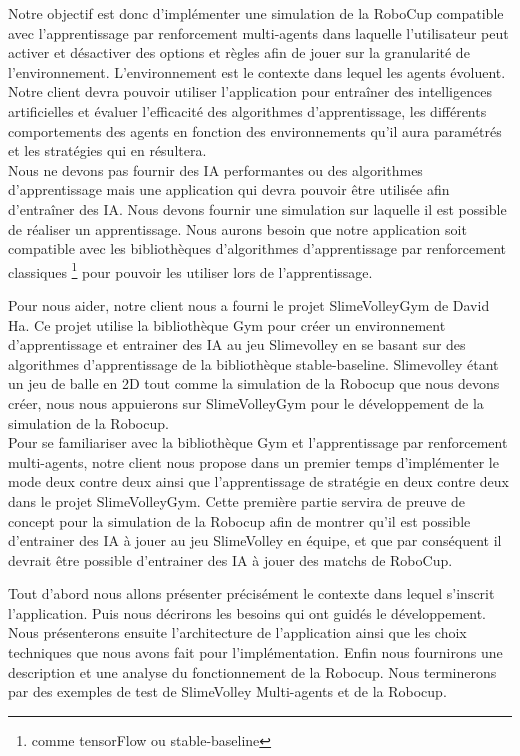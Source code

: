 \documentclass[11pt, a4paper]{article}
\begin{document}
	Notre objectif est donc d'implémenter une simulation de la RoboCup compatible avec l'apprentissage par renforcement multi-agents dans laquelle l'utilisateur peut activer et désactiver des options et règles afin de jouer sur la granularité de l'environnement. L'environnement est le contexte dans lequel les agents évoluent. \\
	Notre client devra pouvoir utiliser l'application pour entraîner des intelligences artificielles et évaluer l'efficacité des algorithmes d'apprentissage, les différents comportements des agents en fonction des environnements qu'il aura paramétrés et les stratégies qui en résultera.\\
	Nous ne devons pas fournir des IA performantes ou des algorithmes d'apprentissage mais une application qui devra pouvoir être utilisée afin d'entraîner des IA. Nous devons fournir une simulation sur laquelle il est possible de réaliser un apprentissage. Nous aurons besoin que notre application soit compatible avec les bibliothèques d'algorithmes d'apprentissage par renforcement classiques \footnote{comme tensorFlow ou stable-baseline} pour pouvoir les utiliser lors de l'apprentissage.

	Pour nous aider, notre client nous a fourni le projet SlimeVolleyGym de David Ha. Ce projet utilise la bibliothèque Gym pour créer un environnement d'apprentissage et entrainer des IA au jeu Slimevolley en se basant sur des algorithmes d'apprentissage de la bibliothèque stable-baseline. Slimevolley étant un jeu de balle en 2D tout comme la simulation de la Robocup que nous devons créer, nous nous appuierons sur SlimeVolleyGym pour le développement de la  simulation de la Robocup.\\
	Pour se familiariser avec la bibliothèque Gym et l’apprentissage par renforcement multi-agents, notre client nous propose dans un premier temps d’implémenter le mode deux contre deux ainsi que l'apprentissage de stratégie en deux contre deux dans le projet SlimeVolleyGym. Cette première partie servira de preuve de concept pour la simulation de la Robocup afin de montrer qu'il est possible d'entrainer des IA à jouer au jeu SlimeVolley en équipe, et que par conséquent il devrait être possible d'entrainer des IA à jouer des matchs de RoboCup.

	Tout d'abord nous allons présenter précisément le contexte dans lequel s'inscrit l'application. Puis nous décrirons les besoins qui ont guidés le développement. Nous présenterons ensuite l'architecture de l'application ainsi que les choix techniques que nous avons fait pour l'implémentation. Enfin nous fournirons une description et une analyse du fonctionnement de la Robocup. Nous terminerons par des exemples de test de SlimeVolley Multi-agents et de la Robocup.
\end{document}
